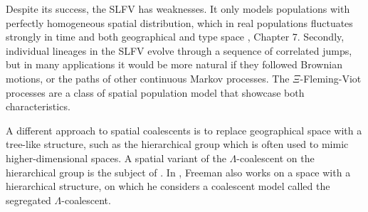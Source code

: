 \documentclass[reqno,draft]{amsart}
\numberwithin{equation}{section}
\theoremstyle{plain}
\theoremstyle{remark}
\begin{document}

Despite its success, the SLFV has weaknesses. It only models populations with perfectly homogeneous spatial distribution, which in real populations fluctuates strongly in time and both geographical and type space \cite{E2008}, Chapter 7. Secondly, individual lineages in the SLFV evolve through a sequence of correlated jumps, but in many applications it would be more natural if they followed Brownian motions, or the paths of other continuous Markov processes.
The $\Xi$-Fleming-Viot processes are a class of spatial population model that showcase both characteristics. %


A different approach to spatial coalescents is to replace geographical space with a tree-like structure, such as the hierarchical group which is often used to mimic higher-dimensional spaces. A spatial variant of the $\Lambda$-coalescent on the hierarchical group is the subject of \cite{greven}. In \cite{F2015}, Freeman also works on a space with a hierarchical structure, on which he considers a coalescent model called the segregated $\Lambda$-coalescent.
\end{document}

